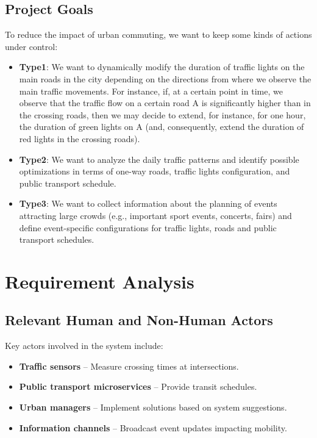 \documentclass[a4paper,12pt]{article}
\begin{document}
\subsection{Project Goals}
To reduce the impact of urban commuting, we want to keep some kinds of actions under control:
\begin{itemize}
    \item \textbf{Type1}: We want to dynamically modify the duration of traffic lights on the main roads in the city depending on the directions from where we observe the main traffic movements. For instance, if, at a certain point in time, we observe that the traffic flow on a certain road A is significantly higher than in the crossing roads, then we may decide to extend, for instance, for one hour, the duration of green lights on A (and, consequently, extend the duration of red lights in the crossing roads). 
    \item \textbf{Type2}: We want to analyze the daily traffic patterns and identify possible optimizations in terms of one-way roads, traffic lights configuration, and public transport schedule.  
    \item \textbf{Type3}: We want to collect information about the planning of events attracting large crowds (e.g., important sport events, concerts, fairs) and define event-specific configurations for traffic lights, roads and public transport schedules. 
\end{itemize}


\newpage

\section{Requirement Analysis}
\subsection{Relevant Human and Non-Human Actors}
Key actors involved in the system include:
\begin{itemize}
    \item \textbf{Traffic sensors} – Measure crossing times at intersections.
    \item \textbf{Public transport microservices} – Provide transit schedules.
    \item \textbf{Urban managers} – Implement solutions based on system suggestions.
    \item \textbf{Information channels} – Broadcast event updates impacting mobility.
\end{itemize}
\end{document}
